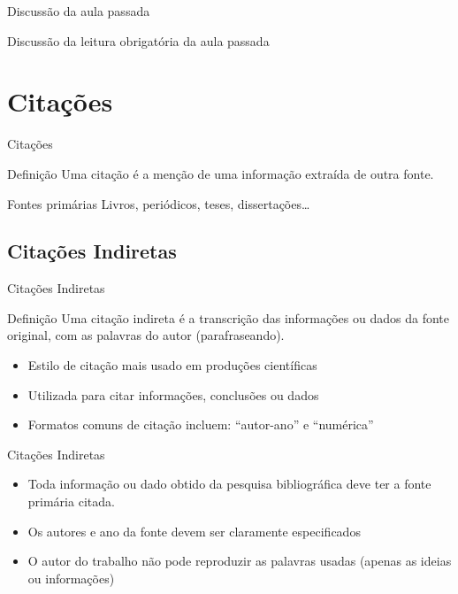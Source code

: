 \documentclass{beamer}
\begin{document}

\begin{frame}{Discussão da aula passada}
  \begin{block}{}
    \footnotesize
    Discussão da leitura obrigatória da aula passada
  \end{block}
\end{frame}

\section{Citações}

\begin{frame}{Citações}
  \begin{block}{Definição}
    \footnotesize
    Uma citação é a menção de uma informação extraída de outra fonte.
  \end{block}
  \begin{exampleblock}{Fontes primárias}
    \footnotesize
    Livros, periódicos, teses, dissertações\ldots
  \end{exampleblock}
\end{frame}

\subsection{Citações Indiretas}

\begin{frame}{Citações Indiretas}
  \begin{block}{Definição}
    \footnotesize
    Uma citação indireta é a transcrição das informações ou dados da
    fonte original, com as palavras do autor (parafraseando).
  \end{block}
  \begin{itemize}
    \scriptsize
  \item Estilo de citação mais usado em produções científicas
  \item Utilizada para citar informações, conclusões ou dados
  \item Formatos comuns de citação incluem: ``autor-ano'' e
    ``numérica''
  \end{itemize}
\end{frame}

\begin{frame}{Citações Indiretas}
  \begin{itemize}
    \footnotesize
  \item \alert{Toda} informação ou dado obtido da pesquisa
    bibliográfica \alert{deve} ter a fonte primária citada.
    \bigskip
  \item Os autores e ano da fonte devem ser claramente especificados
    \bigskip
  \item O autor do trabalho \alert{não pode} reproduzir as palavras
    usadas (apenas as ideias ou informações)
  \end{itemize}
\end{frame}
\end{document}
